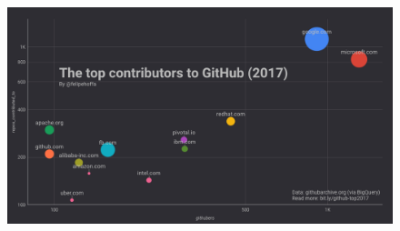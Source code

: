 \documentclass[xcolor=dvipsnames]{beamer}
\begin{document}
\begin{frame}
 	\begin{figure}
	\begin{center}
 	\includegraphics[scale=0.30]{oss_contributors}
	\end{center}
	\end{figure}
\end{frame}
\end{document}
